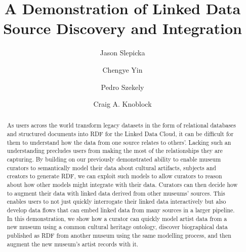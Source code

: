 \documentclass[runningheads,a4paper]{llncs}
\begin{document}
\mainmatter  %

\title{A Demonstration of Linked Data Source Discovery and Integration}


%
\author{Jason Slepicka%
\and Chengye Yin\and Pedro Szekely\and Craig A. Knoblock}
%


\maketitle


\begin{abstract}
As users across the world transform legacy datasets in the form of relational databases and structured documents into RDF for the Linked Data Cloud, it can be difficult for them to understand how the data from one source relates to others'.
Lacking such an understanding precludes users from making the most of the relationships they are capturing. 
By building on our previously demonstrated ability to enable museum curators to semantically model their data about cultural artifacts, subjects and creators to generate RDF, we can exploit such models to allow curators to reason about how other models might integrate with their data.  
Curators can then decide how to augment their data with linked data derived from other museums' sources.
This enables users to not just quickly interrogate their linked data interactively but also develop data flows that can embed linked data from many sources in a larger pipeline. In this demonstration, we show how a curator can quickly model artist data from a new museum using a common cultural heritage ontology, discover biographical data published as RDF from another museum using the same modelling process, and then augment the new museum's artist records with it.  
\end{abstract}
\end{document}
